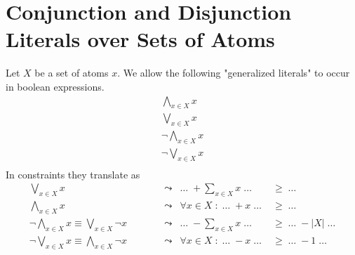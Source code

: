 \documentclass[a4paper]{article}
\begin{document}
\section{Conjunction and Disjunction Literals over Sets of Atoms}
Let $X$ be a set of atoms $x$. We allow the following "generalized literals" to occur in boolean expressions.
\begin{align*}
	\bigwedge_{x \in X} x\\
	\bigvee_{x \in X} x\\
	\neg\bigwedge_{x \in X} x\\
	\neg\bigvee_{x \in X} x\\
\end{align*}
In constraints they translate as
\begin{align*}
	\bigvee_{x \in X} x &
		\quad\quad\quad\leadsto & \ldots \; + \sum_{x \in X}x \; \ldots \; &\ge \; \ldots \\
	\bigwedge_{x \in X} x &
		\quad\quad\quad\leadsto & \forall x \in X \;:\; \ldots \; + x \; \ldots \; &\ge \; \ldots \\
	\neg\bigwedge_{x \in X} x \equiv \bigvee_{x \in X} \neg x &
		\quad\quad\quad\leadsto & \ldots \; - \sum_{x \in X}x \; \ldots \; &\ge \; \ldots \; - |X| \; \ldots \\
	\neg\bigvee_{x \in X} x \equiv \bigwedge_{x \in X} \neg x &
		\quad\quad\quad\leadsto & \forall x \in X \;:\; \ldots \; - x \; \ldots \; &\ge \; \ldots \; - 1 \; \ldots \\
\end{align*}
\end{document}
